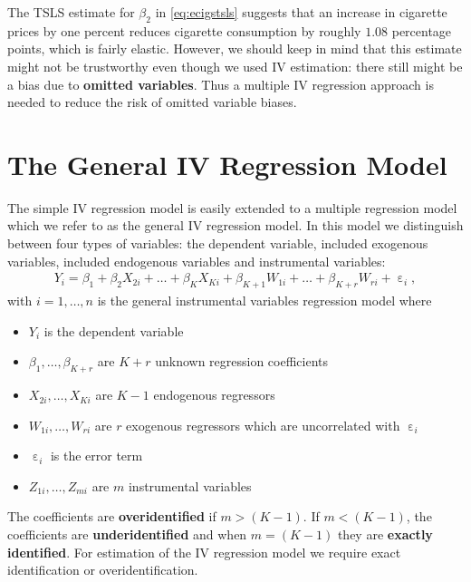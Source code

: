 \documentclass[
  14pt,
]{memoir}
\DeclareMathOperator{\eps}{\varepsilon}
\begin{document}
The TSLS estimate for \(\beta_2\) in \eqref{eq:ecigstsls} suggests that an increase in cigarette prices by one percent reduces cigarette consumption by roughly \(1.08\) percentage points, which is fairly elastic. However, we should keep in mind that this estimate might not be trustworthy even though we used IV estimation: there still might be a bias due to \textbf{omitted variables}. Thus a multiple IV regression approach is needed to reduce the risk of omitted variable biases.

\hypertarget{TGIVRM}{%
\section{The General IV Regression Model}\label{TGIVRM}}

The simple IV regression model is easily extended to a multiple regression model which we refer to as the general IV regression model. In this model we distinguish between four types of variables: the dependent variable, included exogenous variables, included endogenous variables and instrumental variables:
\begin{align}
  Y_i = \beta_1 + \beta_2 X_{2i} + \dots + \beta_K X_{Ki} + \beta_{K+1} W_{1i} + \dots + \beta_{K+r} W_{ri} + \eps_i, \label{eq:givmodel}
\end{align}
with \(i=1,\dots,n\) is the general instrumental variables regression model where

\begin{itemize}
\item $Y_i$ is the dependent variable
\item $\beta_1,\dots,\beta_{K+r}$ are $K+r$ unknown regression coefficients
\item $X_{2i},\dots,X_{Ki}$ are $K-1$ endogenous regressors 
\item $W_{1i},\dots,W_{ri}$ are $r$ exogenous regressors which are uncorrelated with $\eps_i$
\item $\eps_i$ is the error term
\item $Z_{1i},\dots,Z_{mi}$ are $m$ instrumental variables
\end{itemize}
\vspace{0.5cm}

The coefficients are \textbf{overidentified} if \(m>(K-1)\). If \(m<(K-1)\), the coefficients are \textbf{underidentified} and when \(m=(K-1)\) they are \textbf{exactly identified}. For estimation of the IV regression model we require exact identification or overidentification.
\end{document}
